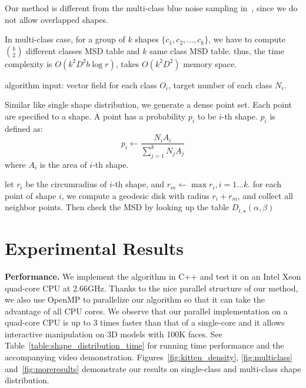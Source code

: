 Our method is different from the multi-class blue noise sampling in~\cite{Wei:2010:MBN:1833351.1778816},
since we do not allow overlapped shapes.

In multi-class case, for a group of $k$ shapes $\{c_1, c_2, \ldots,
c_k\}$, we have to compute $k \choose 2$ different classes MSD table
and $k$ same class MSD table. thus, the time complexity is $O(k^2
D^2 b \log{r})$, takes $O(k^2 D^2)$ memory space.

algorithm input: vector field for each class $O_i$, target number of
each class $N_i$.

Similar like single shape distribution, we generate a dense point
set. Each point are specified to a shape. A point has a probability
$p_i$ to be $i$-th shape. $p_i$ is defined as:
\[ p_i \gets \frac{N_iA_i}{\sum_{j=1}^{k}{N_jA_j}} \]
where $A_i$ is the area of $i$-th shape.

let $r_i$ be the circumradius of $i$-th shape, and $r_m \gets
\max{r_i}, i = 1 \ldots k$. for each point of shape $i$, we compute
a geodesic disk with radius $r_i + r_m$, and collect all neighbor
points. Then check the MSD by looking up the table $D_{i,\star}(\alpha,
\beta)$


\section{Experimental Results}

  \noindent\textbf{Performance.} We implement the algorithm in C++ and test it on an Intel Xeon quad-core CPU at 2.66GHz.
  Thanks to the nice parallel structure of our method, we also use OpenMP to parallelize our algorithm so that it can take the advantage of all CPU cores.
  We observe that our parallel implementation on a quad-core CPU is up to 3 times faster than that of a single-core
  and it allows interactive manipulation on 3D models with 100K faces.
  See Table~\ref{table:shape_distribution_time} for running time performance and the accompanying video demonstration.
  Figures~\ref{fig:kitten_density}, \ref{fig:multiclass} and~\ref{fig:moreresults} demonstrate our results on single-class and multi-class shape distribution.


